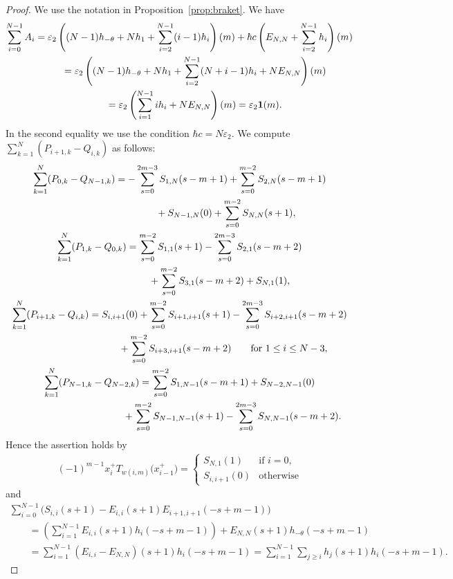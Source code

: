 \documentclass[pdftex]{sigma}
\theoremstyle{definition}
\numberwithin{equation}{section}
\newcommand{\ve}{\varepsilon}
\newcommand{\bfid}{\mathbf{1}}
\begin{document}
\begin{proof} We use the notation in Proposition~\ref{prop:braket}. We have
\begin{gather*}
\sum_{i=0}^{N-1} A_i = \ve_2 \left((N-1)h_{-\theta} + N h_1 + \sum_{i=2}^{N-1}(i-1)h_i\right)(m) + \hbar c \left(E_{N,N}+\sum_{i=2}^{N-1} h_i\right)(m) \\
\hphantom{\sum_{i=0}^{N-1} A_i}{} = \ve_2 \left( (N-1)h_{-\theta} + Nh_1 + \sum_{i=2}^{N-1} (N+i-1) h_i + NE_{N,N} \right)(m) \\
\hphantom{\sum_{i=0}^{N-1} A_i}{} = \ve_2 \left( \sum_{i=1}^{N-1} i h_i + NE_{N,N}\right)(m)=\ve_2 \bfid(m).
\end{gather*}
In the second equality we use the condition $\hbar c = N\ve_2$. We compute $\sum\limits_{k=1}^{N} (P_{i+1,k}-Q_{i,k})$ as follows:
\begin{gather*}
\sum_{k=1}^{N} (P_{0,k}-Q_{N-1,k}) = - \sum_{s=0}^{2m-3}S_{1,N}(s-m+1) + \sum_{s=0}^{m-2}S_{2,N}(s-m+1)\\
\hphantom{\sum_{k=1}^{N} (P_{0,k}-Q_{N-1,k})=}{} +S_{N-1,N}(0)+\sum_{s=0}^{m-2} S_{N,N}(s+1),
\\
\sum_{k=1}^{N} (P_{1,k}-Q_{0,k}) = \sum_{s=0}^{m-2} S_{1,1}(s+1) - \sum_{s=0}^{2m-3}S_{2,1}(s-m+2) \\
\hphantom{\sum_{k=1}^{N} (P_{1,k}-Q_{0,k}) =}{} + \sum_{s=0}^{m-2}S_{3,1}(s-m+2)+S_{N,1}(1),
\\
\sum_{k=1}^{N} (P_{i+1,k}-Q_{i,k}) = S_{i,i+1}(0) + \sum_{s=0}^{m-2} S_{i+1,i+1}(s+1)- \sum_{s=0}^{2m-3}S_{i+2,i+1}(s-m+2) \\
\hphantom{\sum_{k=1}^{N} (P_{i+1,k}-Q_{i,k}) =}{} + \sum_{s=0}^{m-2}S_{i+3,i+1}(s-m+2) \qquad \text{for}\ 1 \leq i \leq N-3,
\\
\sum_{k=1}^{N} (P_{N-1,k}-Q_{N-2,k})= \sum_{s=0}^{m-2}S_{1,N-1}(s-m+1)+S_{N-2,N-1}(0)\\
\hphantom{\sum_{k=1}^{N} (P_{N-1,k}-Q_{N-2,k})=}{} +\sum_{s=0}^{m-2} S_{N-1,N-1}(s+1) - \sum_{s=0}^{2m-3}S_{N,N-1}(s-m+2).
\end{gather*}
Hence the assertion holds by
\begin{gather*}
(-1)^{m-1} x_i^+ T_{w(i,m)}\big(x_{i-1}^+\big) = \begin{cases}
S_{N,1}(1) & \text{if $i=0$,}\\
S_{i,i+1}(0) & \text{otherwise}
\end{cases}
\end{gather*}
and
\begin{gather*}
\sum_{i=0}^{N-1} \big( S_{i,i}(s+1) - E_{i,i}(s+1) E_{i+1,i+1}(-s+m-1) \big) \\
\qquad{}= \left( \sum_{i=1}^{N-1} E_{i,i}(s+1) h_{i}(-s+m-1) \right)+ E_{N,N}(s+1)h_{-\theta}(-s+m-1)\\
\qquad{} = \sum_{i=1}^{N-1} (E_{i,i}-E_{N,N})(s+1) h_{i}(-s+m-1) = \sum_{i=1}^{N-1} \sum_{j \geq i} h_j(s+1) h_i(-s+m-1).\tag*{\qed}
\end{gather*}\renewcommand{\qed}{}
\end{proof}
\end{document}
